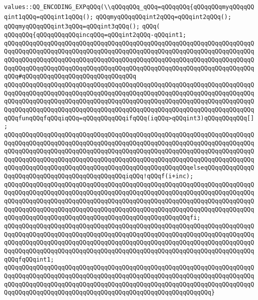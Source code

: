 \verb|values::QQ_ENCODING_EXPqQQq(\\qQQqqQQq_qQQq=qQQqqQQq{qQQqqQQqmyqQQqqQQqint1qQQq=qQQqint1qQQq();|\newline
\verb|qQQqmyqQQqqQQqint2qQQq=qQQqint2qQQq();|\newline
\verb|qQQqmyqQQqqQQqint3qQQq=qQQqint3qQQq();|\newline
\verb|qQQq(|\newline
\verb|qQQqqQQq{qQQqqQQqqQQqincqQQq=qQQqint2qQQq-qQQqint1;|\newline
\verb|qQQqqQQqqQQqqQQqqQQqqQQqqQQqqQQqqQQqqQQqqQQqqQQqqQQqqQQqqQQqqQQqqQQqqQQqqQQqqQQqqQQqqQQqqQQqqQQqqQQqqQQqqQQqqQQqqQQqqQQqqQQqqQQqqQQqqQQqqQQqqQQqqQQqqQQqqQQqqQQqqQQqqQQqqQQqqQQqqQQqqQQqqQQqqQQqqQQqqQQqqQQqqQQqqQQqqQQqqQQqqQQqqQQqqQQqqQQqqQQqqQQqqQQqqQQqqQQqqQQqqQQqqQQqqQQqqQQqqQQqqQQq#qQQqqQQqqQQqqQQqqQQqqQQqqQQqqQQq|\newline
\verb|qQQqqQQqqQQqqQQqqQQqqQQqqQQqqQQqqQQqqQQqqQQqqQQqqQQqqQQqqQQqqQQqqQQqqQQqqQQqqQQqqQQqqQQqqQQqqQQqqQQqqQQqqQQqqQQqqQQqqQQqqQQqqQQqqQQqqQQqqQQqqQQqqQQqqQQqqQQqqQQqqQQqqQQqqQQqqQQqqQQqqQQqqQQqqQQqqQQqqQQqqQQqqQQqqQQqqQQqqQQqqQQqqQQqqQQqqQQqqQQqqQQqqQQqqQQqqQQqqQQqqQQqqQQqqQQqqQQqqQQqqQQqfunqQQqfqQQqiqQQq=qQQqqQQqqQQqifqQQq(iqQQq>qQQqint3)qQQqqQQqqQQq[];|\newline
\verb|qQQqqQQqqQQqqQQqqQQqqQQqqQQqqQQqqQQqqQQqqQQqqQQqqQQqqQQqqQQqqQQqqQQqqQQqqQQqqQQqqQQqqQQqqQQqqQQqqQQqqQQqqQQqqQQqqQQqqQQqqQQqqQQqqQQqqQQqqQQqqQQqqQQqqQQqqQQqqQQqqQQqqQQqqQQqqQQqqQQqqQQqqQQqqQQqqQQqqQQqqQQqqQQqqQQqqQQqqQQqqQQqqQQqqQQqqQQqqQQqqQQqqQQqqQQqqQQqqQQqqQQqqQQqqQQqqQQqqQQqqQQqqQQqqQQqqQQqqQQqqQQqqQQqqQQqqQQqqQQqqQQqqQQqqQQqelseqQQqqQQqqQQqqQQqqQQqqQQqqQQqqQQqqQQqqQQqqQQqqQQqiqQQq!qQQqf(i+inc);|\newline
\verb|qQQqqQQqqQQqqQQqqQQqqQQqqQQqqQQqqQQqqQQqqQQqqQQqqQQqqQQqqQQqqQQqqQQqqQQqqQQqqQQqqQQqqQQqqQQqqQQqqQQqqQQqqQQqqQQqqQQqqQQqqQQqqQQqqQQqqQQqqQQqqQQqqQQqqQQqqQQqqQQqqQQqqQQqqQQqqQQqqQQqqQQqqQQqqQQqqQQqqQQqqQQqqQQqqQQqqQQqqQQqqQQqqQQqqQQqqQQqqQQqqQQqqQQqqQQqqQQqqQQqqQQqqQQqqQQqqQQqqQQqqQQqqQQqqQQqqQQqqQQqqQQqqQQqqQQqqQQqqQQqqQQqqQQqqQQqfi;|\newline
\verb|qQQqqQQqqQQqqQQqqQQqqQQqqQQqqQQqqQQqqQQqqQQqqQQqqQQqqQQqqQQqqQQqqQQqqQQqqQQqqQQqqQQqqQQqqQQqqQQqqQQqqQQqqQQqqQQqqQQqqQQqqQQqqQQqqQQqqQQqqQQqqQQqqQQqqQQqqQQqqQQqqQQqqQQqqQQqqQQqqQQqqQQqqQQqqQQqqQQqqQQqqQQqqQQqqQQqqQQqqQQqqQQqqQQqqQQqqQQqqQQqqQQqqQQqqQQqqQQqqQQqqQQqqQQqqQQqqQQqqQQqqQQqfqQQqint1;|\newline
\verb|qQQqqQQqqQQqqQQqqQQqqQQqqQQqqQQqqQQqqQQqqQQqqQQqqQQqqQQqqQQqqQQqqQQqqQQqqQQqqQQqqQQqqQQqqQQqqQQqqQQqqQQqqQQqqQQqqQQqqQQqqQQqqQQqqQQqqQQqqQQqqQQqqQQqqQQqqQQqqQQqqQQqqQQqqQQqqQQqqQQqqQQqqQQqqQQqqQQqqQQqqQQqqQQqqQQqqQQqqQQqqQQqqQQqqQQqqQQqqQQqqQQqqQQqqQQqqQQqqQQqqQQqqQQq}|\newline
